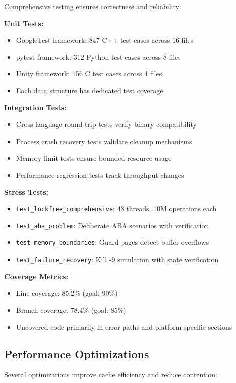 \documentclass[11pt]{article}
\begin{document}
Comprehensive testing ensures correctness and reliability:

\textbf{Unit Tests:}
\begin{itemize}
\item GoogleTest framework: 847 C++ test cases across 16 files
\item pytest framework: 312 Python test cases across 8 files
\item Unity framework: 156 C test cases across 4 files
\item Each data structure has dedicated test coverage
\end{itemize}

\textbf{Integration Tests:}
\begin{itemize}
\item Cross-language round-trip tests verify binary compatibility
\item Process crash recovery tests validate cleanup mechanisms
\item Memory limit tests ensure bounded resource usage
\item Performance regression tests track throughput changes
\end{itemize}

\textbf{Stress Tests:}
\begin{itemize}
\item \texttt{test\_lockfree\_comprehensive}: 48 threads, 10M operations each
\item \texttt{test\_aba\_problem}: Deliberate ABA scenarios with verification
\item \texttt{test\_memory\_boundaries}: Guard pages detect buffer overflows
\item \texttt{test\_failure\_recovery}: Kill -9 simulation with state verification
\end{itemize}

\textbf{Coverage Metrics:}
\begin{itemize}
\item Line coverage: 85.2\% (goal: 90\%)
\item Branch coverage: 78.4\% (goal: 85\%)
\item Uncovered code primarily in error paths and platform-specific sections
\end{itemize}

\subsection{Performance Optimizations}

Several optimizations improve cache efficiency and reduce contention:
\end{document}
